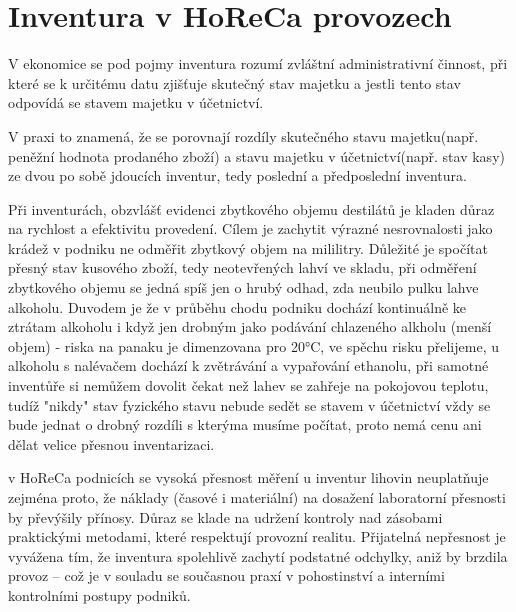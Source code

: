 \chapter{Inventura v HoReCa provozech}
\label{inventura}

V ekonomice se pod pojmy inventura rozumí zvláštní administrativní činnost, při které se k určitému datu zjišťuje skutečný stav majetku a jestli tento stav odpovídá se stavem majetku v účetnictví. 
\cite{Zákon o účetnictví}

V praxi to znamená, že se porovnají rozdíly skutečného stavu majetku(např. peněžní hodnota prodaného zboží) a stavu majetku v účetnictví(např. stav kasy) ze dvou po sobě jdoucích inventur, tedy poslední a předposlední inventura.

	
	Při inventurách, obzvlášť evidenci zbytkového objemu destilátů je kladen důraz na rychlost a efektivitu provedení. Cílem je zachytit výrazné nesrovnalosti jako krádež v podniku ne odměřit zbytkový objem na mililitry. Důležité je spočítat přesný stav kusového zboží, tedy neotevřených lahví ve skladu, při odměření zbytkového objemu se jedná spíš jen o hrubý odhad, zda neubilo pulku lahve alkoholu. Duvodem je že v průběhu chodu podniku dochází kontinuálně ke ztrátam alkoholu  i když jen drobným jako podávání chlazeného alkholu (menší objem) - riska na panaku je dimenzovana pro 20°C, ve spěchu risku přelijeme, u alkoholu s nalévačem dochází k zvětrávání a vypařování ethanolu, při samotné inventůře si nemůžem dovolit čekat než lahev se zahřeje na pokojovou teplotu, tudíž "nikdy" stav fyzického stavu nebude sedět se stavem v účetnictví vždy se bude jednat o drobný rozdíli s kterýma musíme počítat, proto nemá cenu ani dělat velice přesnou inventarizaci.
	
	v HoReCa podnicích se vysoká přesnost měření u inventur lihovin neuplatňuje zejména proto, že náklady (časové i materiální) na dosažení laboratorní přesnosti by převýšily přínosy. Důraz se klade na udržení kontroly nad zásobami praktickými metodami, které respektují provozní realitu. Přijatelná nepřesnost je vyvážena tím, že inventura spolehlivě zachytí podstatné odchylky, aniž by brzdila provoz – což je v souladu se současnou praxí v pohostinství a interními kontrolními postupy podniků.


